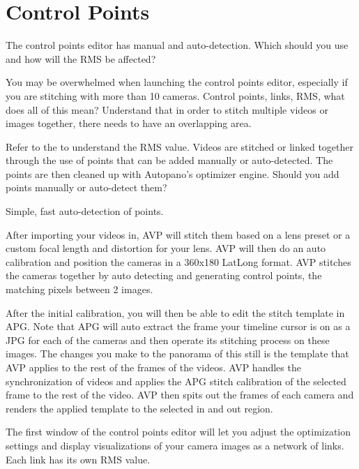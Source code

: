 \section{Control Points}
\pagecolor{white}
\label{chap:36}
\begin{fullwidth}

\problem

{\large The control points editor has manual and auto-detection. Which should you use and how will the RMS be affected? \par}

You may be overwhelmed when launching the control points editor, especially if you are stitching with more than 10 cameras. Control points, links, RMS, what does all of this mean? Understand that in order to stitch multiple videos or images together, there needs to have an overlapping area. 

Refer to the \textbf{} to understand the RMS value. Videos are stitched or linked together through the use of points that can be added manually or auto-detected. The points are then cleaned up with Autopano’s optimizer engine. Should you add points manually or auto-detect them?

\solutions

{\large Simple, fast auto-detection of points. \par}

After importing your videos in, AVP will stitch them based on a lens preset or a custom focal length and distortion for your lens. AVP will then do an auto calibration and position the cameras in a 360x180 LatLong format. AVP stitches the cameras together by auto detecting and generating control points, the matching pixels between 2 images.

After the initial calibration, you will then be able to edit the stitch template in APG. Note that APG will auto extract the frame your timeline cursor is on as a JPG for each of the cameras and then operate its stitching process on these images. The changes you make to the panorama of this still is the template that AVP applies to the rest of the frames of the videos. AVP handles the synchronization of videos and applies the APG stitch calibration of the selected frame to the rest of the video. AVP then spits out the frames of each camera and renders the applied template to the selected in and out region. 

The first window of the control points editor will let you adjust the optimization settings and display visualizations of your camera images as a network of links. Each link has its own RMS value.


\end{fullwidth}
